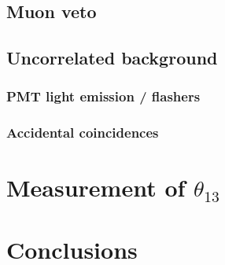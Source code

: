 \documentclass{ucbthesis}
\begin{document}
\section{Muon veto}
\label{sec:muonveto}

\section{Uncorrelated background}

\subsection{PMT light emission / flashers}
\label{subsec:flashers}

\subsection{Accidental coincidences}
\label{subsec:acc}

\chapter{Measurement of $\theta_{13}$}

\chapter{Conclusions}
\end{document}

